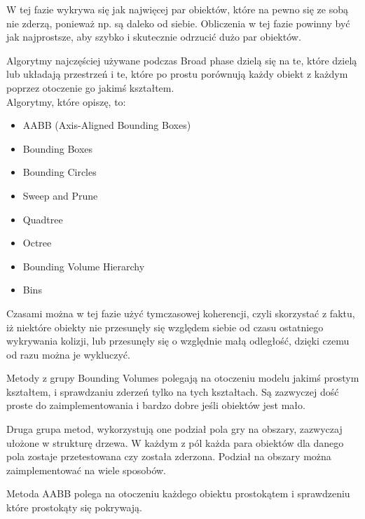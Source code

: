 
W tej fazie wykrywa się jak najwięcej par obiektów, które na pewno się ze sobą nie zderzą, ponieważ np. są daleko od siebie. Obliczenia w tej fazie powinny być jak najprostsze, aby szybko i skutecznie odrzucić dużo par obiektów.

Algorytmy najczę\'sciej używane podczas Broad phase dzielą się na te, które dzielą lub układają przestrzeń i te, które po prostu porównują każdy obiekt z każdym poprzez otoczenie go jakim\'s kształtem.\\
Algorytmy, które opiszę, to:\begin{itemize}[topsep=0.2em, itemsep=0.5em, partopsep=0em, parsep=0em]
	\item AABB (Axis-Aligned Bounding Boxes)
	\item Bounding Boxes
	\item Bounding Circles
	\item Sweep and Prune
	\item Quadtree
	\item Octree
	\item Bounding Volume Hierarchy
	\item Bins
\end{itemize}
\bigskip
\noindent Czasami można w tej fazie użyć tymczasowej koherencji, czyli skorzystać z faktu, iż niektóre obiekty nie przesunęły się względem siebie od czasu ostatniego wykrywania kolizji, lub przesunęły się o względnie małą odległo\'sć, dzięki czemu od razu można je wykluczyć.\\

\smallskip

Metody z grupy Bounding Volumes polegają na otoczeniu modelu jakim\'s prostym kształtem, i sprawdzaniu zderzeń tylko na tych kształtach. Są zazwyczej do\'sć proste do zaimplementowania i bardzo dobre je\'sli obiektów jest mało.\\

\smallskip

Druga grupa metod, wykorzystują one podział pola gry na obszary, zazwyczaj ułożone w strukturę drzewa. W każdym z pól każda para obiektów dla danego pola zostaje przetestowana czy została zderzona. Podział na obszary można zaimplementować na wiele sposobów.

\newpage
{}\smallskip

Metoda AABB polega na otoczeniu każdego obiektu prostokątem i sprawdzeniu które prostokąty się pokrywają.

